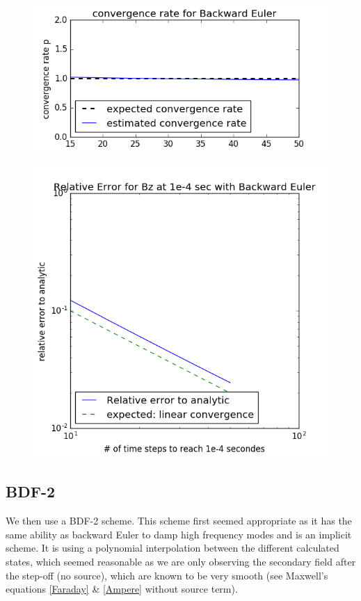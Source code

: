 \documentclass[twoside]{article}
\begin{document}
\begin{figure}[!ht]
\centering
\begin{minipage}{0.5\textwidth}
  \centering
  \includegraphics[width=.9\linewidth]{./figures/backwardEuler/ConvergenceRate_BE.png}
  \label{BE_p}
\end{minipage}%
\begin{minipage}{.5\textwidth}
  \centering
  \includegraphics[width=.9\linewidth]{./figures/backwardEuler/relativeerror_BE_cs10_sig1e-1.png}
  \label{BE_eps}
\end{minipage}
\end{figure}


\subsection{BDF-2}
We then use a BDF-2 scheme. This scheme first seemed appropriate as it has the same ability as backward Euler to damp high frequency modes and is an implicit scheme. It is using a polynomial interpolation between the different calculated states, which seemed reasonable as we are only observing the secondary field after the step-off (no source), which are known to be very smooth (see Maxwell's equations \ref{Faraday} \& \ref{Ampere} without source term).
\end{document}
